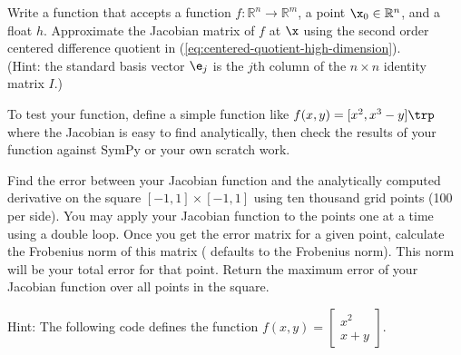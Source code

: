 Write a function that accepts a function $f:\mathbb{R}^n\rightarrow\mathbb{R}^m$, a point $\x_0 \in \mathbb{R}^n$, and a float $h$.
Approximate the Jacobian matrix of $f$ at $\x$ using the second order centered difference quotient in (\ref{eq:centered-quotient-high-dimension}).
\\(Hint: the standard basis vector $\e_j$ is the $j$th column of the $n\times n$ identity matrix $I$.)

To test your function, define a simple function like $f(x,y) = [x^2, x^3 - y]\trp$ where the Jacobian is easy to find analytically, then check the results of your function against SymPy or your own scratch work.
\label{prob:jac_center}

Find the error between your Jacobian function and the analytically computed derivative on the square $[-1,1] \times [-1,1]$ using ten thousand grid points (100 per side).
You may apply your Jacobian function to the points one at a time using a double  loop.  Once you get the error matrix for a given point, calculate the Frobenius norm of this matrix ( defaults to the Frobenius norm).  This norm will be your total error for that point.
Return the maximum error of your Jacobian function over all points in the square.

Hint: The following code defines the function
$f(x,y) = \left[\begin{array}{c} x^2 \\ x+y \end{array}\right]$.

